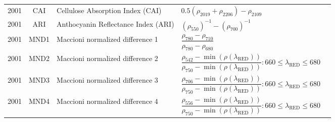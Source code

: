 \documentclass[10pt]{article}
\begin{document}
\begin{ThreePartTable}
\begin{longtable}{c c m{2.80in} M{2.80in} M{1.5in}}
  2001 & CAI     & Cellulose Absorption Index (CAI)                                               & $0.5(\rho_{2019}+\rho_{2206})-\rho_{2109}$                                                                                                                                                                                                                                              & \citet{Daughtry2001}                                \\
  2001 & ARI     & Anthocyanin Reflectance Index (ARI)                                            & $(\rho_{550})^{-1}-(\rho_{700})^{-1}$                                                                                                                                                                                                                                                   & \citet{Gitelson2001}                                \\
  2001 & MND1    & Maccioni normalized difference 1                                               & $\dfrac{\rho_{780}-\rho_{710}}{\rho_{780}-\rho_{680}}$                                                                                                                                                                                                                                  & \citet{Maccioni2001,Datt1999b}                      \\
  2001 & MND2    & Maccioni normalized difference 2                                               & $\dfrac{\rho_{542}-\min(\rho(\lambda_\text{RED}))}{\rho_{750}-\min(\rho(\lambda_\text{RED}))} : 660\le\lambda_\text{RED}\le680$                                                                                                                                                         & \citet{Maccioni2001}                                \\
  2001 & MND3    & Maccioni normalized difference 3                                               & $\dfrac{\rho_{706}-\min(\rho(\lambda_\text{RED}))}{\rho_{750}-\min(\rho(\lambda_\text{RED}))} : 660\le\lambda_\text{RED}\le680$                                                                                                                                                         & \citet{Maccioni2001}                                \\
  2001 & MND4    & Maccioni normalized difference 4                                               & $\dfrac{\rho_{556}-\min(\rho(\lambda_\text{RED}))}{\rho_{750}-\min(\rho(\lambda_\text{RED}))} : 660\le\lambda_\text{RED}\le680$                                                                                                                                                         & \citet{Maccioni2001}                                \\

\end{longtable}
\end{ThreePartTable}
\end{document}
